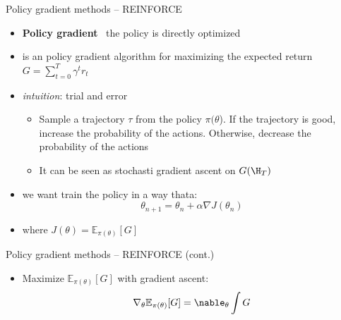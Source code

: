 \documentclass[presentation, 9pt]{beamer}\mode<presentation>{\usetheme{AMSBolognaFC}}
\begin{document}
\begin{frame}{Policy gradient methods -- REINFORCE}
	\begin{itemize}
		\item \textbf{Policy gradient} \faArrowRight \, the policy is directly optimized
		\item {} is an policy gradient algorithm for maximizing the expected return $G = \sum_{t=0}^T \gamma^t r_t$
		\item \emph{intuition}: trial and error
		\begin{itemize}
			\item Sample a trajectory $\tau$ from the policy $\pi(\theta$). If the trajectory is good, increase the probability of the actions. Otherwise, decrease the probability of the actions
			\item It can be seen as stochasti gradient ascent on $G(\H_T)$
		\end{itemize}
		\item we want train the policy in a way thata:
		\begin{equation*}
			\theta_{n+1} = \theta_{n} + \alpha \nabla J(\theta_n)
		\end{equation*}
		\item where $J(\theta) = \mathbb{E}_{\pi(\theta)}[G]$
	\end{itemize}
\end{frame}	
\begin{frame}{Policy gradient methods -- REINFORCE (cont.)}
\begin{itemize}
	\item Maximize $ \mathbb{E}_{\pi(\theta)}[G]$ with gradient ascent:
	\begin{equation*}
		\nabla_\theta \mathbb{E}_{\pi(\theta)}[G] = \nable_\theta \int G
	\end{equation*}
\end{itemize}
\end{frame}
\section*{}

\frame{\titlepage}

\section*{\refname}



\end{document}
